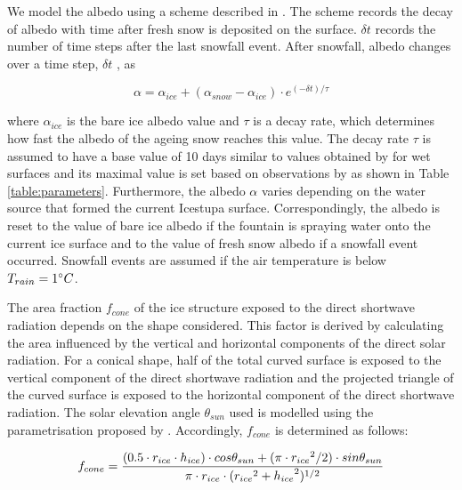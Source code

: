 \documentclass[utf8]{frontiersSCNS} %
\begin{document}
We model the albedo using a scheme described in \cite{OerlemansKnap_1998}. The scheme records the decay of albedo with
time after fresh snow is deposited on the surface. $\delta t$ records the number of time steps after the last snowfall
event. After snowfall, albedo changes over a time step, $\delta t$ , as

\begin{equation} \alpha=\alpha_{ice}+(\alpha_{snow}-\alpha_{ice}) \cdot e^{(-\delta t)/\tau} \label{eqn:a}
\end{equation}

where $\alpha_{ice}$ is the bare ice albedo value and $\tau$ is a decay rate, which determines how fast the albedo of
the ageing snow reaches this value.  The decay rate $\tau$ is assumed to have a base value of 10 days similar to
values obtained by \cite{Schmidt_2017} for wet surfaces and its maximal value is set based on observations by
\cite{OerlemansKnap_1998} as shown in Table \ref{table:parameters}. Furthermore, the albedo $\alpha$ varies depending
on the water source that formed the current Icestupa surface. Correspondingly, the albedo is reset to the value of
bare ice albedo if the fountain is spraying water onto the current ice surface and to the value of fresh snow albedo
if a snowfall event occurred. Snowfall events are assumed if the air temperature is below $T_{rain}=1 \degree C$.

The area fraction $f_{cone}$ of the ice structure exposed to the direct shortwave radiation depends on the shape
considered. This factor is derived by calculating the area influenced by the vertical and horizontal components of the
direct solar radiation. For a conical shape, half of the total curved surface is exposed to the vertical component of
the direct shortwave radiation and the projected triangle of the curved surface is exposed to the horizontal component
of the direct shortwave radiation. The solar elevation angle $\theta_{sun}$ used is modelled using the parametrisation
proposed by \cite{Woolf_1968}. Accordingly, $f_{cone}$ is determined as follows:

\begin{equation} \begin{split} f_{cone}& =\frac{(0.5 \cdot r_{ice} \cdot h_{ice}) \cdot cos \theta_{sun} +(\pi \cdot
{r_{ice}}^2/2) \cdot sin \theta_{sun} }{\pi \cdot r_{ice} \cdot ({r_{ice}}^2+{h_{ice}}^2)^{1/2}}\\ \end{split}
\label{eqn:f_{cone}} \end{equation}
\end{document}
